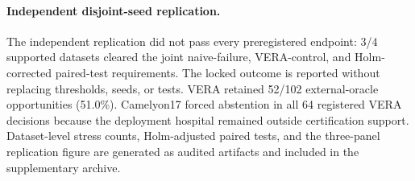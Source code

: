 \paragraph{Independent disjoint-seed replication.}
The independent replication did not pass every preregistered endpoint: 3/4 supported datasets cleared the joint naive-failure, VERA-control, and Holm-corrected paired-test requirements. The locked outcome is reported without replacing thresholds, seeds, or tests.
VERA retained 52/102 external-oracle opportunities (51.0\%). Camelyon17 forced abstention in all 64 registered VERA decisions because the deployment hospital remained outside certification support.
Dataset-level stress counts, Holm-adjusted paired tests, and the three-panel replication figure are generated as audited artifacts and included in the supplementary archive.